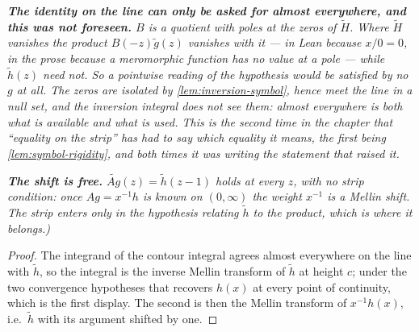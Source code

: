 \begin{lemma}
\emph{\textbf{The identity on the line can only be asked for almost everywhere, and this was not
foreseen.} $B$ is a quotient with poles at the zeros of $\tilde H$. Where $\tilde H$ vanishes the
product $B(-z)\tilde g(z)$ vanishes with it --- in Lean because $x/0 = 0$, in the prose because a
meromorphic function has no value at a pole --- while $\tilde h(z)$ need not. So a pointwise reading
of the hypothesis would be satisfied by no $g$ at all. The zeros are isolated by
\ref{lem:inversion-symbol}, hence meet the line in a null set, and the inversion integral does not
see them: almost everywhere is both what is available and what is used. This is the second time in
the chapter that ``equality on the strip'' has had to say which equality it means, the first being
\ref{lem:symbol-rigidity}, and both times it was writing the statement that raised it.}

\emph{\textbf{The shift is free.} $\widetilde{Ag}(z) = \tilde h(z-1)$ holds at every $z$, with no strip
condition: once $Ag = x^{-1}h$ is known on $(0,\infty)$ the weight $x^{-1}$ is a Mellin shift. The
strip enters only in the hypothesis relating $\tilde h$ to the product, which is where it belongs.)}
\end{lemma}

\begin{proof}
\leanok
{}
The integrand of the contour integral agrees almost everywhere on the line with $\tilde h$, so the
integral is the inverse Mellin transform of $\tilde h$ at height $c$; under the two convergence
hypotheses that recovers $h(x)$ at every point of continuity, which is the first display. The
second is then the Mellin transform of $x^{-1}h(x)$, i.e.\ $\tilde h$ with its argument shifted by
one.
\end{proof}


